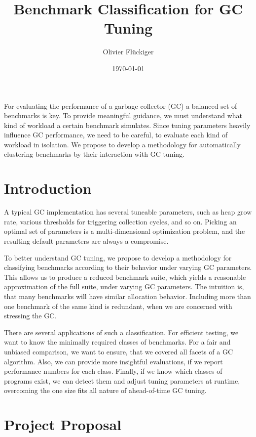 \documentclass[12pt]{article}
\title{Benchmark Classification for GC Tuning}
\author{Olivier Flückiger}
\date{\today}
\begin{document}
\maketitle

\abstract

For evaluating the performance of a garbage collector (GC) a balanced set of benchmarks is key.
To provide meaningful guidance, we must understand what kind of workload a certain benchmark simulates.
Since tuning parameters heavily influence GC performance, we need to be careful, to evaluate each kind of workload in isolation.
We propose to develop a methodology for automatically clustering benchmarks by their interaction with GC tuning.

\section{Introduction}

A typical GC implementation has several tuneable parameters, such as heap grow rate, various thresholds for triggering collection cycles, and so on.
Picking an optimal set of parameters is a multi-dimensional optimization problem, and the resulting default parameters are always a compromise.

To better understand GC tuning, we propose to develop a methodology for classifying benchmarks according to their behavior under varying GC parameters.
This allows us to produce a reduced benchmark suite, which yields a reasonable approximation of the full suite, under varying GC parameters.
The intuition is, that many benchmarks will have similar allocation behavior.
Including more than one benchmark of the same kind is redundant, when we are concerned with stressing the GC.

There are several applications of such a classification.
For efficient testing, we want to know the minimally required classes of benchmarks.
For a fair and unbiased comparison, we want to ensure, that we covered all facets of a GC algorithm.
Also, we can provide more insightful evaluations, if we report performance numbers for each class.
Finally, if we know which classes of programs exist, we can detect them and adjust tuning parameters at runtime, overcoming the one size fits all nature of ahead-of-time GC tuning.

\section{Project Proposal}
\end{document}
